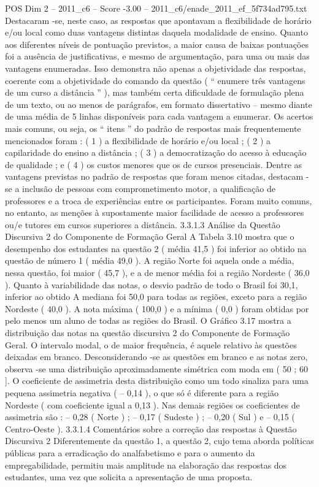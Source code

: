 \begin{textsample}{POS Dim 2 – 2011\_c6 – Score -3.00 – 2011\_c6/enade\_2011\_ef\_5f734ad795.txt}
Destacaram -se, neste caso, as respostas que apontavam a flexibilidade de horário e/ou local como duas vantagens distintas daquela modalidade de ensino.
Quanto aos diferentes níveis de pontuação previstos, a maior causa de baixas pontuações foi a ausência de justificativas, e mesmo de argumentação, para uma ou mais das vantagens enumeradas.
Isso demonstra não apenas a objetividade das respostas, coerente com a objetividade do comando da questão ( “ enumere três vantagens de um curso a distância ” ), mas também certa dificuldade de formulação plena de um texto, ou ao menos de parágrafos, em formato dissertativo – mesmo diante de uma média de 5 linhas disponíveis para cada vantagem a enumerar.
Os acertos mais comuns, ou seja, os “ itens ” do padrão de respostas mais frequentemente mencionados foram : ( 1 ) a flexibilidade de horário e/ou local ; ( 2 ) a capilaridade do ensino a distância ; ( 3 ) a democratização do acesso à educação de qualidade ; e ( 4 ) os custos menores que os de cursos presenciais.
Dentre as vantagens previstas no padrão de respostas que foram menos citadas, destacam -se a inclusão de pessoas com comprometimento motor, a qualificação de professores e a troca de experiências entre os participantes.
Foram muito comuns, no entanto, as menções à supostamente maior facilidade de acesso a professores ou/e tutores em cursos superiores a distância. 3.3.1.3 Análise da Questão Discursiva 2 do Componente de Formação Geral A Tabela 3.10 mostra que o desempenho dos estudantes na questão 2 ( média 41,5 ) foi inferior ao obtido na questão de número 1 ( média 49,0 ).
A região Norte foi aquela onde a média, nessa questão, foi maior ( 45,7 ), e a de menor média foi a região Nordeste ( 36,0 ).
Quanto à variabilidade das notas, o desvio padrão de todo o Brasil foi 30,1, inferior ao obtido A mediana foi 50,0 para todas as regiões, exceto para a região Nordeste ( 40,0 ).
A nota máxima ( 100,0 ) e a mínima ( 0,0 ) foram obtidas por pelo menos um aluno de todas as regiões do Brasil.
O Gráfico 3.17 mostra a distribuição das notas na questão discursiva 2 do Componente de Formação Geral.
O intervalo modal, o de maior frequência, é aquele relativo às questões deixadas em branco.
Desconsiderando -se as questões em branco e as notas zero, observa -se uma distribuição aproximadamente simétrica com moda em ( 50 ; 60 ].
O coeficiente de assimetria desta distribuição como um todo sinaliza para uma pequena assimetria negativa ( – 0,14 ), o que só é diferente para a região Nordeste ( com coeficiente igual a 0,13 ).
Nas demais regiões os coeficientes de assimetria são : – 0,28 ( Norte ) ; – 0,17 ( Sudeste ) ; – 0,20 ( Sul ) e – 0,15 ( Centro-Oeste ). 3.3.1.4 Comentários sobre a correção das respostas à Questão Discursiva 2 Diferentemente da questão 1, a questão 2, cujo tema aborda políticas públicas para a erradicação do analfabetismo e para o aumento da empregabilidade, permitiu mais amplitude na elaboração das respostas dos estudantes, uma vez que solicita a apresentação de uma proposta.

\end{textsample}

